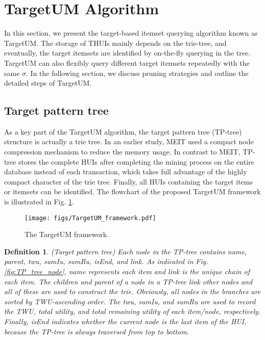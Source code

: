 \documentclass[journal]{IEEEtran}
\newtheorem{definition}{Definition}[section]
\begin{document}
\section{TargetUM Algorithm}
\label{sec:algorithm}

In this section, we present the target-based itemset querying algorithm known as TargetUM. The storage of THUIs mainly depends on the trie-tree, and eventually, the target itemsets are identified by on-the-fly querying in the tree. TargetUM can also flexibly query different target itemsets repeatedly with the same $\sigma$. In the following section, we discuss pruning strategies and outline the detailed steps of TargetUM.

\subsection{Target pattern tree}

As a key part of the TargetUM algorithm, the target pattern tree (TP-tree) structure is actually a trie tree. In an earlier study, MEIT \cite{fournier2013meit} used a compact node compression mechanism to reduce the memory usage. In contrast to MEIT, TP-tree stores the complete HUIs after completing the mining process on the entire database instead of each transaction, which takes full advantage of the highly compact character of the trie tree. Finally, all HUIs containing the target items or itemsets can be identified. The flowchart of the proposed TargetUM framework is illustrated in Fig. \ref{fig:TargetUM_framework}.  

\begin{figure}[!htbp]
	\centering
	\texttt{[image: figs/TargetUM\_framework.pdf]}
	\caption{The TargetUM framework.}
	\label{fig:TargetUM_framework}
\end{figure}

\begin{definition}
	\rm (\textit{Target pattern tree}) Each node in the TP-tree contains \textit{name}, \textit{parent}, \textit{twu}, \textit{sumIu}, \textit{sumRu}, \textit{isEnd}, and \textit{link}. As indicated in Fig. \ref{fig:TP_tree_node}, \textit{name} represents each item and \textit{link} is the unique chain of each item. The \textit{children} and \textit{parent} of a node in a TP-tree link other nodes and all of these are used to construct the trie. Obviously, all nodes in the branches are sorted by \textit{TWU}-ascending order. The \textit{twu}, \textit{sumIu}, and \textit{sumRu} are used to record the \textit{TWU}, total utility, and total remaining utility of each item/node, respectively. Finally, \textit{isEnd} indicates whether the current node is the last item of the HUI, because the TP-tree is always traversed from top to bottom.
\end{definition}
\end{document}
